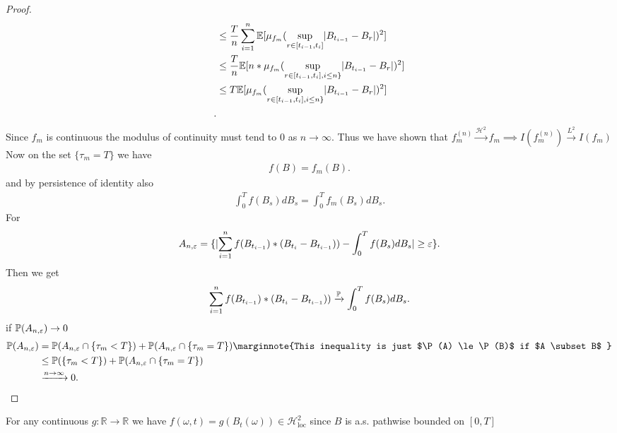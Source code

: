 \begin{proof}
\begin{align*}
                                          &\le  \frac{T}{n} \sum_{i=1}^{n} \E[ \mu_{f_m}(\sup_{r \in [t_{i-1},t_i]} \abs{B_{t_{i-1}}-B_r})^2] \\
                                          &\le  \frac{T}{n} \E[n* \mu_{f_m}(\sup_{r \in [t_{i-1},t_i],i\le n\}  } \abs{B_{t_{i-1}}-B_r})^2] \\
                                          &\le  T \E[\mu_{f_m}(\sup_{r \in [t_{i-1},t_i],i\le n\}  } \abs{B_{t_{i-1}}-B_r})^2] \\
.\end{align*}
Since $f_m$ is continuous the modulus of continuity must tend to 0 as $n\to \infty$.
Thus we have shown that $f_m^{(n)} \xrightarrow{\mathcal{H}^2} f_m  \implies I(f_m^{(n)} ) \xrightarrow{L^2} I(f_m)$\\
Now on the set $\{\tau_m = T\}  $ we have 
\begin{align*}
  f(B) = f_m(B) 
.\end{align*}
and  by persistence of identity also 
\begin{align*}
  \int_0^{T} f(B_s) dB_s = \int_0^{T}   f_m(B_s) dB_s
.\end{align*}
For 
\begin{align*}
  A_{n,\epsilon } = \{\abs{\sum_{i=1}^{n} f(B_{t_{i-1}})*(B_{t_i}-B_{t_{i-1}}))  - \int_0^{T} f(B_s) dB_s } \ge  \epsilon\}  
.\end{align*}
Then we get 
\begin{align*}
\sum_{i=1}^{n} f(B_{t_{i-1}})*(B_{t_i}-B_{t_{i-1}}))  \xrightarrow{\P} \int_0^{T} f(B_s) dB_s 
.\end{align*}
if $\P(A_{n,\epsilon}) \to 0$ 
\begin{align*}
  \P(A_{n,\epsilon}) &= \P(A_{n,\epsilon} \cap \{\tau_m < T\} ) + \P(A_{n,\epsilon} \cap \{\tau_m = T\} ) \marginnote{This inequality is just $\P(A) \le  \P(B)$ if $A \subset B$ } \\
                     &\le  \P(\{\tau_m < T\} ) + \P(A_{n,\epsilon} \cap \{\tau_m = T\} ) \\ 
                     &\xrightarrow{n\to \infty} 0 
.\end{align*}
\end{proof}
\spewnotes
\begin{remark}[3.12]
  For any continuous $g: \mathbb{R}\to \mathbb{R}$  we have $f(\omega ,t) = g(B_t(\omega )) \in  \mathcal{H}^{2}_{\text{loc}} $  since $B$ is a.s. pathwise
  bounded on $[0,T]$
\end{remark}
